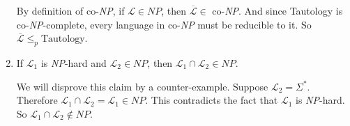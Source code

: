 \documentclass{article}
\newcommand{\lang}{\mathcal{L}}
\begin{document}
\begin{enumerate}[label=\alph*.]
		By definition of co-\textit{NP}, if \(\lang \in \mathit{NP}\), then \(\overline{\lang} \in\) co-\textit{NP}. And since Tautology is co-\textit{NP}-complete, every language in co-\textit{NP} must be reducible to it. So \(\overline{\lang} \leq_p \text{Tautology}\).

	\item
		If \(\lang_1\) is \textit{NP}-hard and \(\lang_2 \in \mathit{NP}\), then \(\lang_1 \cap \lang_2 \in \mathit{NP}\).

		We will disprove this claim by a counter-example. Suppose \(\lang_2 = \Sigma^*\). Therefore \(\lang_1 \cap \lang_2 = \lang_1 \in \mathit{NP}\). This contradicts the fact that \(\lang_1\) is \textit{NP}-hard. So \(\lang_1 \cap \lang_2 \notin \mathit{NP}\).
\end{enumerate}
\end{document}
